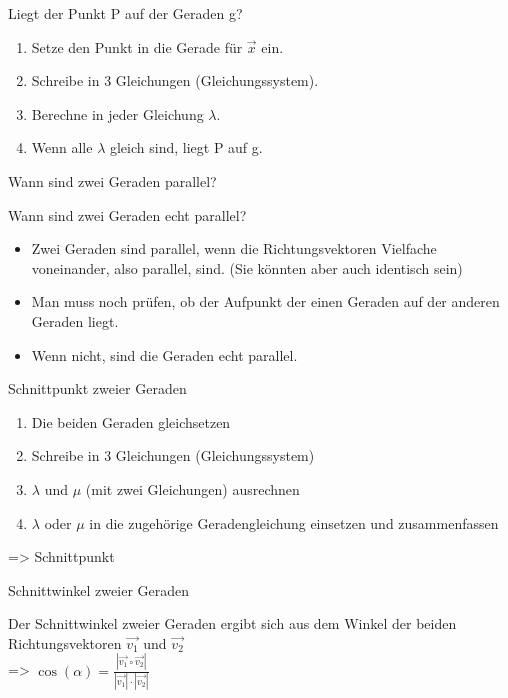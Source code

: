 \documentclass[paper=a6,ngerman,twoside=true,fontsize=14pt, parskip = half]{scrartcl}
\begin{document}
\begin{frage}
	Liegt der Punkt P auf der Geraden g?
	
\end{frage}
\begin{antwort}	
	\begin{enumerate} 
		\item Setze den Punkt in die Gerade für $\vec{x}$ ein.	
		\item Schreibe in 3 Gleichungen (Gleichungssystem).
		\item Berechne in jeder Gleichung $\lambda$.
		\item Wenn alle $\lambda$ gleich sind, liegt P auf g.
	\end{enumerate} 
		
\end{antwort}	
\begin{frage}
	Wann sind zwei Geraden parallel?
	
	Wann sind zwei Geraden echt parallel?
	
\end{frage}
\begin{antwort}	
	\begin{itemize} 
		\item Zwei Geraden sind parallel, wenn die Richtungsvektoren Vielfache voneinander, also parallel, sind.	
		(Sie könnten aber auch identisch sein)
		\item Man muss noch prüfen, ob der Aufpunkt der einen Geraden auf der anderen Geraden liegt.
		\item Wenn nicht, sind die Geraden echt parallel.
	\end{itemize} 
	
\end{antwort}	
\begin{frage}
	Schnittpunkt zweier Geraden
	
\end{frage}
\begin{antwort}	
	\begin{enumerate} 
		\item Die beiden Geraden gleichsetzen
		\item Schreibe in 3 Gleichungen (Gleichungssystem)
		\item $\lambda$ und $\mu$ (mit zwei Gleichungen) ausrechnen
		\item  $\lambda$ oder $\mu$ in die zugehörige Geradengleichung einsetzen und zusammenfassen
	\end{enumerate} 
	\bigskip
	=> Schnittpunkt
	
\end{antwort}		
\begin{frage}
	Schnittwinkel zweier Geraden
	
\end{frage}
\begin{antwort}	
		Der Schnittwinkel zweier Geraden ergibt sich aus dem Winkel der beiden Richtungsvektoren $\vec{v_1}$ und $\vec{v_2}$ \\
		=> $\cos(\alpha)=\frac{|\vec{v_1} \circ \vec{v_2}|}{|\vec{v_1}|\cdot|\vec{v_2}|}$	
\end{antwort}		
\end{document}
